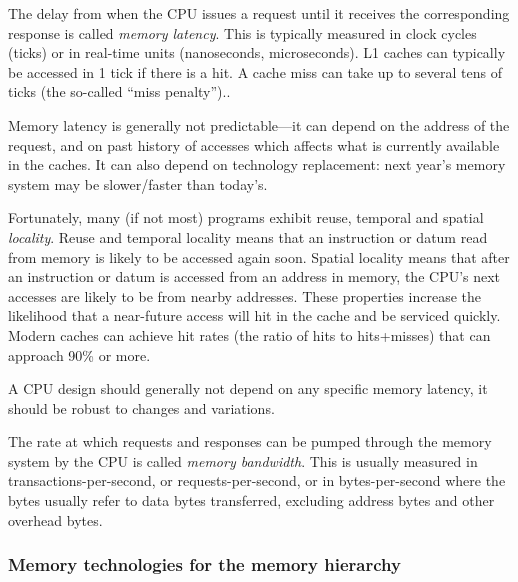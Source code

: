 \label{Sec_mem_latency}


The delay from when the CPU issues a request until it receives the
corresponding response is called \emph{memory latency}.  This is
typically measured in clock cycles (ticks) or in real-time units
(nanoseconds, microseconds).  L1 caches can typically be accessed in 1
tick if there is a hit.  A cache miss can take up to several tens of
ticks (the so-called ``miss penalty'')..

Memory latency is generally not predictable---it can depend on the
address of the request, and on past history of accesses which affects
what is currently available in the caches.  It can also depend on
technology replacement: next year's memory system may be slower/faster
than today's.

Fortunately, many (if not most) programs exhibit reuse, temporal and
spatial \emph{locality}. Reuse and temporal locality means that an
instruction or datum read from memory is likely to be accessed again
soon.  Spatial locality means that after an instruction or datum is
accessed from an address in memory, the CPU's next accesses are likely
to be from nearby addresses.  These properties increase the likelihood
that a near-future access will hit in the cache and be serviced
quickly.  Modern caches can achieve hit rates (the ratio of hits to
hits+misses) that can approach 90\% or more.

A CPU design should generally not depend on any specific memory
latency, {\ie} it should be robust to changes and variations.


The rate at which requests and responses can be pumped through the
memory system by the CPU is called \emph{memory bandwidth}.  This is
usually measured in transactions-per-second, or requests-per-second,
or in bytes-per-second where the bytes usually refer to data bytes
transferred, excluding address bytes and other overhead bytes.


\subsubsection{Memory technologies for the memory hierarchy}


